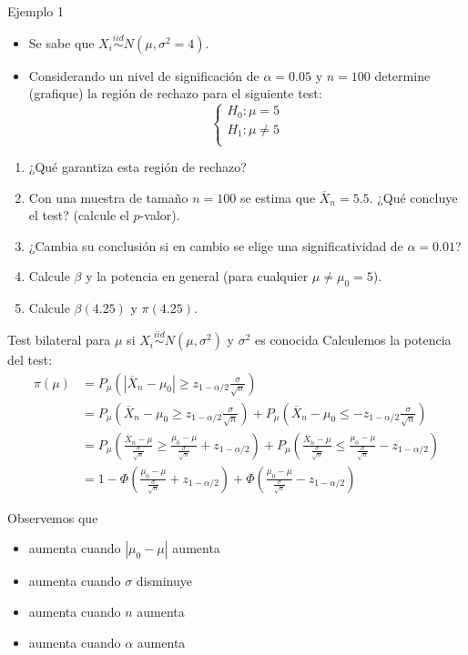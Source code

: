 \documentclass{beamer}
\theoremstyle{definition}
\begin{document}
\begin{frame}{\color{rosee}Ejemplo 1}
\begin{itemize}
    \item Se sabe que $X_i\stackrel{iid}{\sim} N(\mu,\sigma^2=4)$.\medskip
    \item Considerando un nivel de significación de $\alpha = 0.05$ y $n=100$ determine (grafique) la región de rechazo para el siguiente test:
\[\begin{cases}
H_0: \mu = 5\\
H_1: \mu \neq 5\\
\end{cases}
\]
\end{itemize}
\begin{enumerate}
\item ¿Qué garantiza esta región de rechazo?\medskip
\item Con una muestra de tamaño $n=100$ se estima que $\overline{X}_n=5.5$. ¿Qué concluye el test? (calcule el $p$-valor).\medskip
\item ¿Cambia su conclusión si en cambio se elige una significatividad de $\alpha = 0.01$? \medskip
\item Calcule $\beta$ y la potencia en general (para cualquier  $\mu\neq\mu_0= 5$).\medskip
\item Calcule $\beta(4.25)$ y  $\pi(4.25)$.
\end{enumerate}    
\end{frame}
  
\begin{frame}{\color{rosee}Test bilateral para $\mu$ si $X_i\stackrel{iid}{\sim}N(\mu,\sigma^2)$ y $\sigma^2$ es conocida}\small
  Calculemos la potencia del test:
  \begin{align*}
    \pi(\mu) 
    &= P_{\mu}\left(|\overline{X}_n - \mu_0| \geq z_{1-\alpha/2}
      \frac{\sigma}{\sqrt{n}}\right)\\
    & =  P_{\mu}\left(\overline{X}_n - \mu_0 \geq z_{1-\alpha/2}
      \frac{\sigma}{\sqrt{n}}\right) + P_{\mu}\left(\overline{X}_n - \mu_0 \leq - z_{1-\alpha/2}
      \frac{\sigma}{\sqrt{n}}\right) \\
    & =  P_{\mu}\left(\frac{\overline{X}_n - \mu}{\frac{\sigma}{\sqrt{n}}} \geq
      \frac{\mu_0 -\mu}{\frac{\sigma}{\sqrt{n}}} + z_{1-\alpha/2} \right) +
      P_{\mu}\left(\frac{\overline{X}_n - \mu}{\frac{\sigma}{\sqrt{n}}} \leq
      \frac{\mu_0-\mu}{\frac{\sigma}{\sqrt{n}}}- z_{1-\alpha/2} \right) \\
    & =  1- \Phi\left(\frac{\mu_0 -\mu}{\frac{\sigma}{\sqrt{n}}} + z_{1-\alpha/2} \right) +
      \Phi\left(\frac{\mu_0-\mu}{\frac{\sigma}{\sqrt{n}}}- z_{1-\alpha/2} \right)
  \end{align*}

    Observemos que 
  \begin{itemize}
  \item aumenta cuando $|\mu_0-\mu|$ aumenta
  \item aumenta cuando $\sigma$ disminuye
  \item aumenta cuando $n$ aumenta
  \item aumenta cuando $\alpha$ aumenta
  \end{itemize}
\end{frame}
\end{document}
